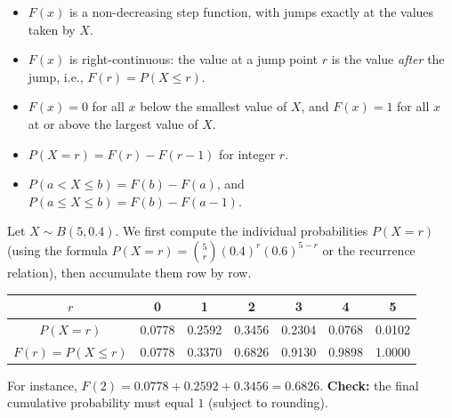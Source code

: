 \documentclass[11pt]{article}
\begin{document}
\begin{aretenir}
\begin{itemize}
\item $F(x)$ is a non-decreasing step function, with jumps exactly at the values taken by $X$.
\item $F(x)$ is right-continuous: the value at a jump point $r$ is the value \emph{after} the jump, i.e., $F(r) = P(X \le r)$.
\item $F(x) = 0$ for all $x$ below the smallest value of $X$, and $F(x) = 1$ for all $x$ at or above the largest value of $X$.
\item $P(X = r) = F(r) - F(r-1)$ for integer $r$.
\item $P(a < X \le b) = F(b) - F(a)$, and $P(a \le X \le b) = F(b) - F(a-1)$.
\end{itemize}
\end{aretenir}

\begin{exemplebox}
Let $X \sim B(5, 0.4)$. We first compute the individual probabilities $P(X=r)$ (using the formula $P(X=r)=\binom{5}{r}(0.4)^r(0.6)^{5-r}$ or the recurrence relation), then accumulate them row by row.

\begin{center}
\begin{tabular}{|c|cccccc|}
\hline
$r$ & 0 & 1 & 2 & 3 & 4 & 5 \\
\hline
$P(X=r)$ & 0.0778 & 0.2592 & 0.3456 & 0.2304 & 0.0768 & 0.0102 \\
\hline
$F(r)=P(X\le r)$ & 0.0778 & 0.3370 & 0.6826 & 0.9130 & 0.9898 & 1.0000 \\
\hline
\end{tabular}
\end{center}
For instance, $F(2) = 0.0778 + 0.2592 + 0.3456 = 0.6826$.
\textbf{Check:} the final cumulative probability must equal $1$ (subject to rounding).
\end{exemplebox}
\end{document}
